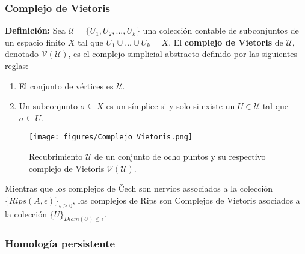 \documentclass[a4paper,11pt]{article}
\begin{document}
\subsubsection*{Complejo de Vietoris}
\textbf{Definición:} Sea $\mathcal{U}=\{U_{1}, U_{2}, ... ,U_{k}\}$ una colección contable de subconjuntos de un espacio finito $X$ tal que $U_{1}\cup ... \cup U_{k}=X$. El \textbf{complejo de Vietoris} de $\mathcal{U}$, denotado \textbf{$\mathcal{V}(\mathcal{U})$}, es el complejo simplicial abstracto definido por las siguientes reglas:
\begin{enumerate}
    \item El conjunto de vértices es $\mathcal{U}$.
    \item Un subconjunto $\sigma \subseteq X$ es un símplice si y solo si existe un $U \in \mathcal{U}$ tal que $\sigma \subseteq U$.
\end{enumerate}
\begin{figure}[!htb]
  \centering
  \texttt{[image: figures/Complejo\_Vietoris.png]}
  \caption{Recubrimiento $\mathcal{U}$ de un conjunto de ocho puntos y su respectivo complejo de Vietoris $\mathcal{V}(\mathcal{U})$.}
\end{figure}
Mientras que los complejos de Čech son nervios associados a la colección $\{Rips(A,\epsilon)\}_{\epsilon \geq 0}$, los complejos de Rips son Complejos de Vietoris asociados a la colección $\{U\}_{Diam(U)\leq \epsilon}$.



\subsubsection{Homología persistente}

\end{document}

